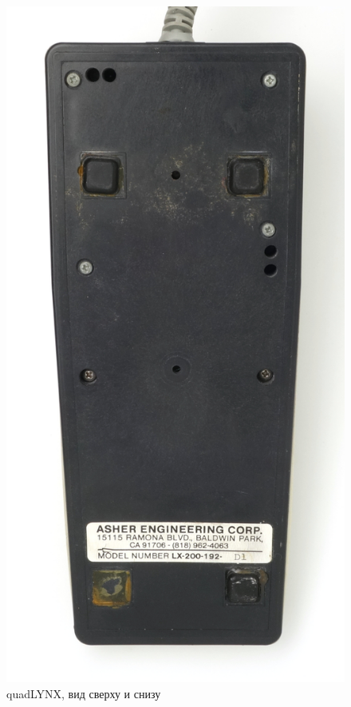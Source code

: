 \documentclass[11pt, a4paper]{article}
\begin{document}
\begin{figure}[h]
    \includegraphics[scale=0.4]{1986_honeywell_asher_quadlynx_trackball/bottom_30.jpg}
    \caption{quadLYNX, вид сверху и снизу}
    \label{fig:quadLYNXTopBottom}
\end{figure}
\end{document}
